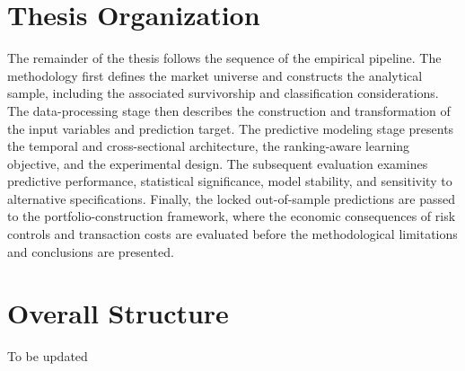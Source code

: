 \section{Thesis Organization}
The remainder of the thesis follows the sequence of the empirical pipeline. The methodology first defines the market universe and constructs the analytical sample, including the associated survivorship and classification considerations. The data-processing stage then describes the construction and transformation of the input variables and prediction target. The predictive modeling stage presents the temporal and cross-sectional architecture, the ranking-aware learning objective, and the experimental design. The subsequent evaluation examines predictive performance, statistical significance, model stability, and sensitivity to alternative specifications. Finally, the locked out-of-sample predictions are passed to the portfolio-construction framework, where the economic consequences of risk controls and transaction costs are evaluated before the methodological limitations and conclusions are presented.

\section{Overall Structure}
To be updated
